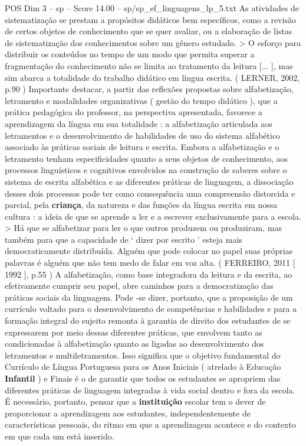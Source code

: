 \begin{textsample}{POS Dim 3 – sp – Score 14.00 – sp/sp\_ef\_linguagens\_lp\_5.txt}
As atividades de sistematização se prestam a propósitos didáticos bem específicos, como a revisão de certos objetos de conhecimento que se quer avaliar, ou a elaboração de listas de sistematização dos conhecimentos sobre um gênero estudado. > O esforço para distribuir os conteúdos no tempo de um modo que permita superar a fragmentação do conhecimento não se limita ao tratamento da leitura [... ], mas sim abarca a totalidade do trabalho didático em língua escrita. ( LERNER, 2002, p.90 ) Importante destacar, a partir das reflexões propostas sobre alfabetização, letramento e modalidades organizativas ( gestão do tempo didático ), que a prática pedagógica do professor, na perspectiva apresentada, favorece a aprendizagem da língua em sua totalidade : a alfabetização articulada aos letramentos e o desenvolvimento de habilidades de uso do sistema alfabético associado às práticas sociais de leitura e escrita.
Embora a alfabetização e o letramento tenham especificidades quanto a seus objetos de conhecimento, aos processos linguísticos e cognitivos envolvidos na construção de saberes sobre o sistema de escrita alfabética e as diferentes práticas de linguagem, a dissociação desses dois processos pode ter como consequência uma compreensão distorcida e parcial, pela \textbf{criança}, da natureza e das funções da língua escrita em nossa cultura : a ideia de que se aprende a ler e a escrever exclusivamente para a escola. > Há que se alfabetizar para ler o que outros produzem ou produziram, mas também para que a capacidade de ‘ dizer por escrito ’ esteja mais democraticamente distribuída.
Alguém que pode colocar no papel suas próprias palavras é alguém que não tem medo de falar em voz alta. ( FERREIRO, 2011 [ 1992 ], p.55 ) A alfabetização, como base integradora da leitura e da escrita, ao efetivamente cumprir seu papel, abre caminhos para a democratização das práticas sociais da linguagem.
Pode -se dizer, portanto, que a proposição de um currículo voltado para o desenvolvimento de competências e habilidades e para a formação integral do sujeito remonta à garantia de direito dos estudantes de se expressarem por meio dessas diferentes práticas, que envolvem tanto as condicionadas à alfabetização quanto as ligadas ao desenvolvimento dos letramentos e multiletramentos.
Isso significa que o objetivo fundamental do Currículo de Língua Portuguesa para os Anos Iniciais ( atrelado à Educação \textbf{Infantil} ) e Finais é o de garantir que todos os estudantes se apropriem das diferentes práticas de linguagem integradas à vida social dentro e fora da escola.
É necessário, portanto, pensar que a \textbf{instituição} escolar tem o dever de proporcionar a aprendizagem aos estudantes, independentemente de características pessoais, do ritmo em que a aprendizagem acontece e do contexto em que cada um está inserido.

\end{textsample}
